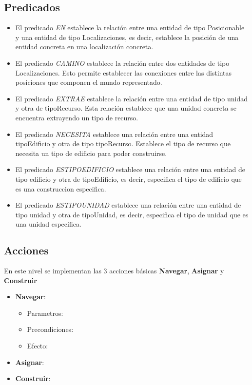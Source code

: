 \subsection{Predicados}
\begin{itemize}
   \item El predicado \textit{EN} establece la relación entre una entidad de tipo Posicionable y una entidad de tipo Localizaciones, es decir, establece la posición de una entidad concreta en una localización concreta.
   \item El predicado \textit{CAMINO} establece la relación entre dos entidades de tipo Localizaciones. Esto permite establecer las conexiones entre las distintas posiciones que componen el mundo representado.
   \item El predicado \textit{EXTRAE} establece la relación entre una entidad de tipo unidad y otra de tipoRecurso. Esta relación establece que una unidad concreta se encuentra extrayendo un tipo de recurso.
   \item El predicado \textit{NECESITA} establece una relación entre una entidad tipoEdificio y otra de tipo tipoRecurso. Establece el tipo de recurso que necesita un tipo de edificio para poder construirse.
   \item El predicado \textit{ESTIPOEDIFICIO} establece una relación entre una entidad de tipo edificio y otra de tipoEdificio, es decir, especifica el tipo de edificio que es una construccion especifica.
   \item El predicado \textit{ESTIPOUNIDAD} establece una relación entre una entidad de tipo unidad y otra de tipoUnidad, es decir, especifica el tipo de unidad que es una unidad especifica.
\end{itemize}

\subsection{Acciones}
En este nivel se implementan las 3 acciones básicas \textbf{Navegar}, \textbf{Asignar} y \textbf{Construir}
\begin{itemize}
   \item \textbf{Navegar}:
      \begin{itemize}
         \item Parametros:
         \item Precondiciones:
         \item Efecto:
      \end{itemize}
   \item \textbf{Asignar}:
   \item \textbf{Construir}:
\end{itemize}

